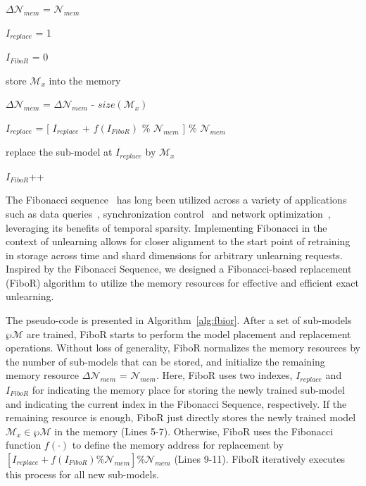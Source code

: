 \documentclass[conference,compsoc]{IEEEtran}
\begin{document}
\begin{algorithm}[t]
\footnotesize
\DontPrintSemicolon

  $\Delta \mathcal{N}_{mem}$ = $\mathcal{N}_{mem}$

  $I_{replace}$ = 1

  $I_{FiboR}$ = 0

  {
    {
        store $\mathcal{M}_x$ into the memory
        
        $\Delta \mathcal{N}_{mem}$ = $\Delta \mathcal{N}_{mem}$ - $size(\mathcal{M}_x)$
    }
    \Else
    {
        $I_{replace}$ = [ $I_{replace}$ + $f(I_{FiboR})$ \%  $\mathcal{N}_{mem}$ ] \%  $\mathcal{N}_{mem}$

        replace the sub-model at $I_{replace}$ by $\mathcal{M}_x$

        $I_{FiboR}$++
    }
  }
\caption{Fibonacci-based Replacement}
\label{alg:fbior}
\end{algorithm}

The Fibonacci sequence~\cite{fibonacci} has long been utilized across a variety of applications such as data queries~\cite{brodal2012two}, synchronization control~\cite{kautz1965fibonacci} and network optimization~\cite{fredman1987fibonacci}, leveraging its benefits of temporal sparsity. Implementing Fibonacci in the context of unlearning allows for closer alignment to the start point of retraining in storage across time and shard dimensions for arbitrary unlearning requests. Inspired by the Fibonacci Sequence, we designed a Fibonacci-based replacement (FiboR) algorithm to utilize the memory resources for effective and efficient exact unlearning.


The pseudo-code is presented in Algorithm~\ref{alg:fbior}. After a set of sub-models $\wp\mathcal{M}$ are trained, FiboR starts to perform the model placement and replacement operations. Without loss of generality, FiboR normalizes the memory resources by the number of sub-models that can be stored, and initialize the remaining memory resource $\Delta \mathcal{N}_{mem}$ = $\mathcal{N}_{mem}$. Here, FiboR uses two indexes, \ie $I_{replace}$ and $I_{FiboR}$ for indicating the memory place for storing the newly trained sub-model and indicating the current index in the Fibonacci Sequence, respectively. If the remaining resource is enough, FiboR just directly stores the newly trained model $\mathcal{M}_x \in \wp\mathcal{M}$  in the memory (Lines 5-7). Otherwise, FiboR uses the Fibonacci function $f(\cdot)$ to define the memory address for replacement by  $[I_{replace} + f(I_{FiboR}) \%  \mathcal{N}_{mem}]  \%  \mathcal{N}_{mem}$ (Lines 9-11). FiboR iteratively executes this process for all new sub-models. 
\end{document}

